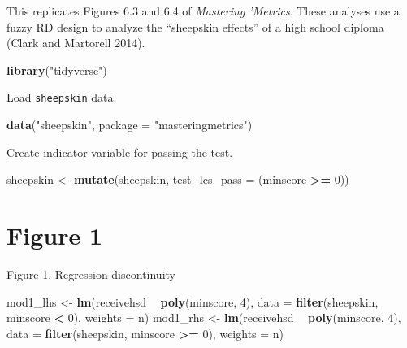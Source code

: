 \documentclass[]{book}
\newenvironment{Shaded}{\begin{snugshade}}{\end{snugshade}}
\newcommand{\KeywordTok}[1]{\textcolor[rgb]{0.13,0.29,0.53}{\textbf{#1}}}
\newcommand{\DataTypeTok}[1]{\textcolor[rgb]{0.13,0.29,0.53}{#1}}
\newcommand{\DecValTok}[1]{\textcolor[rgb]{0.00,0.00,0.81}{#1}}
\newcommand{\StringTok}[1]{\textcolor[rgb]{0.31,0.60,0.02}{#1}}
\newcommand{\OperatorTok}[1]{\textcolor[rgb]{0.81,0.36,0.00}{\textbf{#1}}}
\newcommand{\NormalTok}[1]{#1}
\theoremstyle{definition}
\theoremstyle{definition}
\theoremstyle{definition}
\theoremstyle{remark}
\begin{document}
This replicates Figures 6.3 and 6.4 of \emph{Mastering 'Metrics}. These
analyses use a fuzzy RD design to analyze the ``sheepskin effects'' of a
high school diploma (Clark and Martorell 2014).

\begin{Shaded}
\begin{Highlighting}[]
\KeywordTok{library}\NormalTok{(}\StringTok{"tidyverse"}\NormalTok{)}
\end{Highlighting}
\end{Shaded}

Load \texttt{sheepskin} data.

\begin{Shaded}
\begin{Highlighting}[]
\KeywordTok{data}\NormalTok{(}\StringTok{"sheepskin"}\NormalTok{, }\DataTypeTok{package =} \StringTok{"masteringmetrics"}\NormalTok{)}
\end{Highlighting}
\end{Shaded}

Create indicator variable for passing the test.

\begin{Shaded}
\begin{Highlighting}[]
\NormalTok{sheepskin <-}\StringTok{ }\KeywordTok{mutate}\NormalTok{(sheepskin, }\DataTypeTok{test_lcs_pass =}\NormalTok{ (minscore }\OperatorTok{>=}\StringTok{ }\DecValTok{0}\NormalTok{))}
\end{Highlighting}
\end{Shaded}

\section{Figure 1}\label{figure-1}

Figure 1. Regression discontinuity

\begin{Shaded}
\begin{Highlighting}[]
\NormalTok{mod1_lhs <-}\StringTok{ }\KeywordTok{lm}\NormalTok{(receivehsd }\OperatorTok{~}\StringTok{ }\KeywordTok{poly}\NormalTok{(minscore, }\DecValTok{4}\NormalTok{),}
               \DataTypeTok{data =} \KeywordTok{filter}\NormalTok{(sheepskin, minscore }\OperatorTok{<}\StringTok{ }\DecValTok{0}\NormalTok{), }\DataTypeTok{weights =}\NormalTok{ n)}
\NormalTok{mod1_rhs <-}\StringTok{ }\KeywordTok{lm}\NormalTok{(receivehsd }\OperatorTok{~}\StringTok{ }\KeywordTok{poly}\NormalTok{(minscore, }\DecValTok{4}\NormalTok{),}
               \DataTypeTok{data =} \KeywordTok{filter}\NormalTok{(sheepskin, minscore }\OperatorTok{>=}\StringTok{ }\DecValTok{0}\NormalTok{), }\DataTypeTok{weights =}\NormalTok{ n)}
\end{Highlighting}
\end{Shaded}
\end{document}
